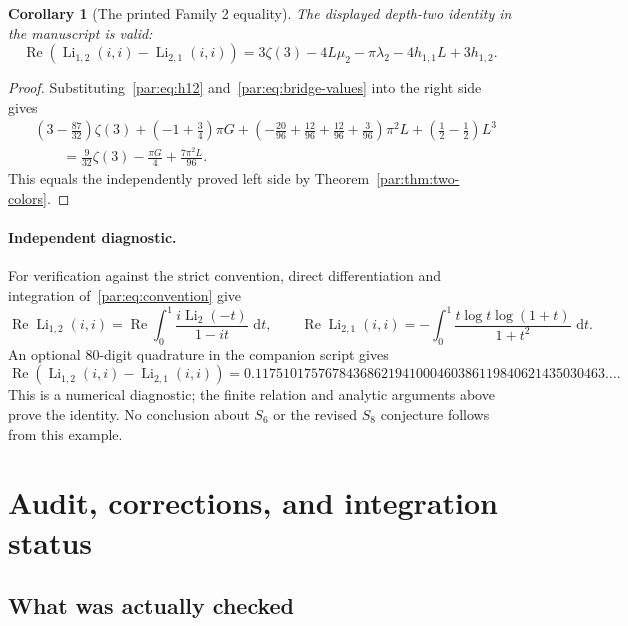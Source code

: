 \documentclass[11pt,a4paper]{article}
\numberwithin{equation}{section}
\newtheorem{corollary}[theorem]{Corollary}
\theoremstyle{definition}
\theoremstyle{remark}
\DeclareMathOperator{\Li}{Li}
\newcommand{\dd}{\,\mathrm d}
\begin{document}
\begin{corollary}[The printed Family 2 equality]\label{par:cor:family2-printed}
The displayed depth-two identity in the manuscript is valid:
\begin{equation}\label{par:eq:family2-printed}
 \operatorname{Re}\!\left(\Li_{1,2}(i,i)-\Li_{2,1}(i,i)\right)
 =3\zeta(3)-4L\mu_2-\pi\lambda_2-4h_{1,1}L+3h_{1,2}.
\end{equation}
\end{corollary}
\begin{proof}
Substituting~\eqref{par:eq:h12} and~\eqref{par:eq:bridge-values} into the
right side gives
\begin{align*}
 &\left(3-\frac{87}{32}\right)\zeta(3)
 +\left(-1+\frac34\right)\pi G
 +\left(-\frac{20}{96}+\frac{12}{96}
          +\frac{12}{96}+\frac3{96}\right)\pi^2L
 +\left(\frac12-\frac12\right)L^3\\
 &\qquad=\frac9{32}\zeta(3)-\frac{\pi G}{4}
                 +\frac{7\pi^2L}{96}.
\end{align*}
This equals the independently proved left side by
Theorem~\ref{par:thm:two-colors}.
\end{proof}

\paragraph{Independent diagnostic.}
For verification against the strict convention, direct differentiation
and integration of~\eqref{par:eq:convention} give
\[
 \operatorname{Re}\Li_{1,2}(i,i)
 =\operatorname{Re}\int_0^1\frac{i\Li_2(-t)}{1-it}\,\dd t,
 \qquad
 \operatorname{Re}\Li_{2,1}(i,i)
 =-\int_0^1\frac{t\log t\log(1+t)}{1+t^2}\,\dd t.
\]
An optional $80$-digit quadrature in the companion script gives
\[
 \operatorname{Re}\!\left(\Li_{1,2}(i,i)-\Li_{2,1}(i,i)\right)
 =0.11751017576784368621941000460386119840621435030463\ldots.
\]
This is a numerical diagnostic; the finite relation and analytic
arguments above prove the identity. No conclusion about $S_6$ or the
revised $S_8$ conjecture follows from this example.


\section{Audit, corrections, and integration status}
\label{sec:audit}

\subsection{What was actually checked}
\end{document}
